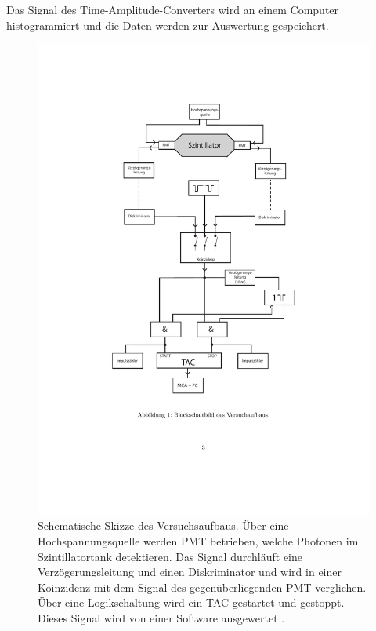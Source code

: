 Das Signal des Time-Amplitude-Converters wird an einem Computer histogrammiert und die Daten werden zur Auswertung gespeichert.

\begin{figure}
    \centering
    \includegraphics[width=.8\textwidth]{content/pics/Schaltbild.pdf}
    \caption{Schematische Skizze des Versuchsaufbaus. Über eine Hochspannungsquelle werden PMT betrieben, welche Photonen im Szintillatortank %
    detektieren. Das Signal durchläuft eine Verzögerungsleitung und einen Diskriminator und wird in einer Koinzidenz mit dem Signal des gegenüberliegenden PMT verglichen. %
    Über eine Logikschaltung wird ein TAC gestartet und gestoppt. Dieses Signal wird von einer Software ausgewertet \cite{V01}.}
    \label{fig:Aufbau}
  \end{figure}


